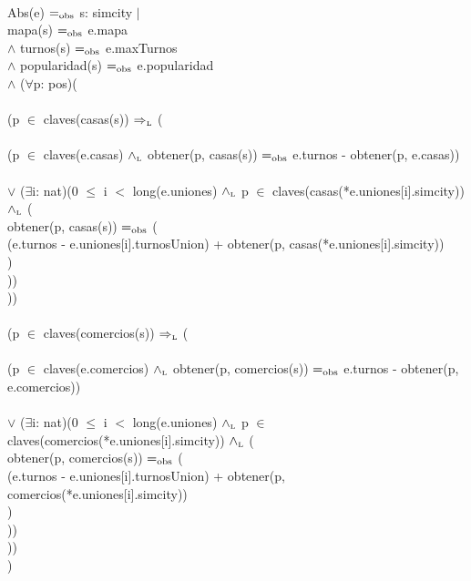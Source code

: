 \begin{Representacion}
~


Abs(e) $=_{\mathrm{obs}}$ s: simcity $\mid$ \\
    \tab mapa(s) $=_{\mathrm{obs}}$ e.mapa \\
    \tab $\land$ turnos(s) $=_{\mathrm{obs}}$ e.maxTurnos \\
    \tab $\land$ popularidad(s) $=_{\mathrm{obs}}$ e.popularidad \\
    \tab $\land$ ($\forall$p: pos)( \\
    \tab{} \\
    \tab\tab (p $\in$ claves(casas(s)) $\Rightarrow_{\mathrm{\scriptscriptstyle{L}}}$ ( \\
    \tab\tab{} \\
    \tab\tab\tab (p $\in$ claves(e.casas) $\land_{\mathrm{\scriptscriptstyle{L}}}$ obtener(p, casas(s)) $=_{\mathrm{obs}}$ e.turnos - obtener(p, e.casas)) \\
    \tab\tab{} \\
    \tab\tab\tab $\lor$ ($\exists$i: nat)(0 $\leq$ i $<$ long(e.uniones) $\land_{\mathrm{\scriptscriptstyle{L}}}$ p $\in$ claves(casas(*e.uniones[i].simcity)) $\land_{\mathrm{\scriptscriptstyle{L}}}$ ( \\
    \tab\tab\tab\tab obtener(p, casas(s)) $=_{\mathrm{obs}}$ ( \\
    \tab\tab\tab\tab\tab (e.turnos - e.uniones[i].turnosUnion) + obtener(p, casas(*e.uniones[i].simcity)) \\
    \tab\tab\tab\tab ) \\
    \tab\tab\tab )) \\
    \tab\tab )) \\
    \tab{} \\
    \tab\tab (p $\in$ claves(comercios(s)) $\Rightarrow_{\mathrm{\scriptscriptstyle{L}}}$ ( \\
    \tab\tab{} \\
    \tab\tab\tab (p $\in$ claves(e.comercios) $\land_{\mathrm{\scriptscriptstyle{L}}}$ obtener(p, comercios(s)) $=_{\mathrm{obs}}$ e.turnos - obtener(p, e.comercios)) \\
    \tab\tab{} \\
    \tab\tab\tab $\lor$ ($\exists$i: nat)(0 $\leq$ i $<$ long(e.uniones) $\land_{\mathrm{\scriptscriptstyle{L}}}$ p $\in$ claves(comercios(*e.uniones[i].simcity)) $\land_{\mathrm{\scriptscriptstyle{L}}}$ ( \\
    \tab\tab\tab\tab obtener(p, comercios(s)) $=_{\mathrm{obs}}$ ( \\
    \tab\tab\tab\tab\tab (e.turnos - e.uniones[i].turnosUnion) + obtener(p, comercios(*e.uniones[i].simcity)) \\
    \tab\tab\tab\tab ) \\
    \tab\tab\tab )) \\
    \tab\tab )) \\
    \tab )

\end{Representacion}

